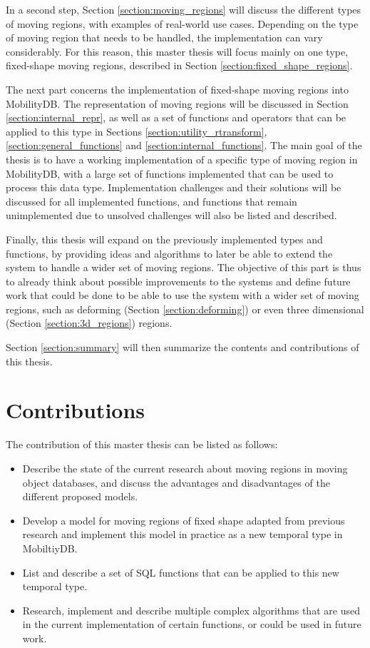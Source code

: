 In a second step, Section \ref{section:moving_regions} will discuss the different types of moving regions, with examples of real-world use cases. Depending on the type of moving region that needs to be handled, the implementation can vary considerably. For this reason, this master thesis will focus mainly on one type, fixed-shape moving regions, described in Section \ref{section:fixed_shape_regions}.

The next part concerns the implementation of fixed-shape moving regions into MobilityDB. The representation of moving regions will be discussed in Section \ref{section:internal_repr}, as well as a set of functions and operators that can be applied to this type in Sections \ref{section:utility_rtransform}, \ref{section:general_functions} and \ref{section:internal_functions}. The main goal of the thesis is to have a working implementation of a specific type of moving region in MobilityDB, with a large set of functions implemented that can be used to process this data type. Implementation challenges and their solutions will be discussed for all implemented functions, and functions that remain unimplemented due to unsolved challenges will also be listed and described.

Finally, this thesis will expand on the previously implemented types and functions, by providing ideas and algorithms to later be able to extend the system to handle a wider set of moving regions. The objective of this part is thus to already think about possible improvements to the systems and define future work that could be done to be able to use the system with a wider set of moving regions, such as deforming (Section \ref{section:deforming}) or even three dimensional (Section \ref{section:3d_regions}) regions.

Section \ref{section:summary} will then summarize the contents and contributions of this thesis.

\section{Contributions}

The contribution of this master thesis can be listed as follows:

\begin{itemize}
    \item Describe the state of the current research about moving regions in moving object databases, and discuss the advantages and disadvantages of the different proposed models.
    \item Develop a model for moving regions of fixed shape adapted from previous research and implement this model in practice as a new temporal type in MobiltiyDB.
    \item List and describe a set of SQL functions that can be applied to this new temporal type.
    \item Research, implement and describe multiple complex algorithms that are used in the current implementation of certain functions, or could be used in future work.
\end{itemize}

